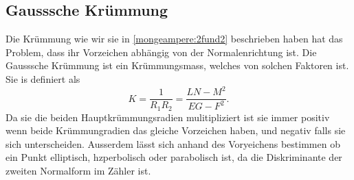 \subsection{Gausssche Krümmung}
Die Krümmung wie wir sie in \eqref{mongeampere:2fund2} beschrieben haben hat das Problem, dass
ihr Vorzeichen abhängig von der Normalenrichtung ist.
Die Gausssche Krümmung ist ein Krümmungsmass, welches von solchen Faktoren ist.
Sie is definiert als 
\begin{equation}
  K = \frac{1}{R_1 R_2} = \frac{LN-M^2}{EG-F^2}.
  \label{mongemapere:gausskrumm}
\end{equation}
Da sie die beiden Hauptkrümmungsradien mulitipliziert ist sie immer positiv wenn 
beide Krümmungradien das gleiche Vorzeichen haben, und negativ falls sie sich unterscheiden.
Ausserdem lässt sich anhand des Voryeichens bestimmen ob ein Punkt elliptisch, hzperbolisch oder parabolisch 
ist, da die Diskriminante der zweiten Normalform im Zähler ist.
